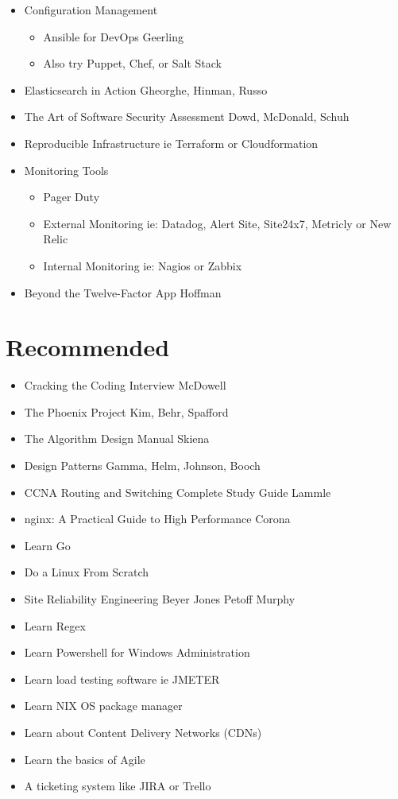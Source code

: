 \documentclass[12pt]{article}
\begin{document}
\begin{itemize}
\item Configuration Management
  \begin{itemize}
  \item Ansible for DevOps Geerling 
  \item Also try Puppet, Chef, or Salt Stack
  \end{itemize}
\item Elasticsearch in Action Gheorghe, Hinman, Russo
\item The Art of Software Security Assessment Dowd, McDonald, Schuh
\item Reproducible Infrastructure ie Terraform or Cloudformation
\item Monitoring Tools
  \begin{itemize}
  \item Pager Duty
  \item External Monitoring ie: Datadog, Alert Site, Site24x7,
    Metricly or New Relic
  \item Internal Monitoring ie: Nagios or Zabbix
  \end{itemize}
\item Beyond the Twelve-Factor App Hoffman
\end{itemize}

\section{Recommended}
\begin{itemize}
\item Cracking the Coding Interview McDowell
\item The Phoenix Project Kim, Behr, Spafford
\item The Algorithm Design Manual Skiena
\item Design Patterns Gamma, Helm, Johnson, Booch
\item CCNA Routing and Switching Complete Study Guide Lammle
\item nginx: A Practical Guide to High Performance Corona
\item Learn Go
\item Do a Linux From Scratch
\item Site Reliability Engineering Beyer Jones Petoff Murphy
\item Learn Regex
\item Learn Powershell for Windows Administration
\item Learn load testing software ie JMETER
\item Learn NIX OS package manager
\item Learn about Content Delivery Networks (CDNs)
\item Learn the basics of Agile
\item A ticketing system like JIRA or Trello
\end{itemize}
\end{document}
